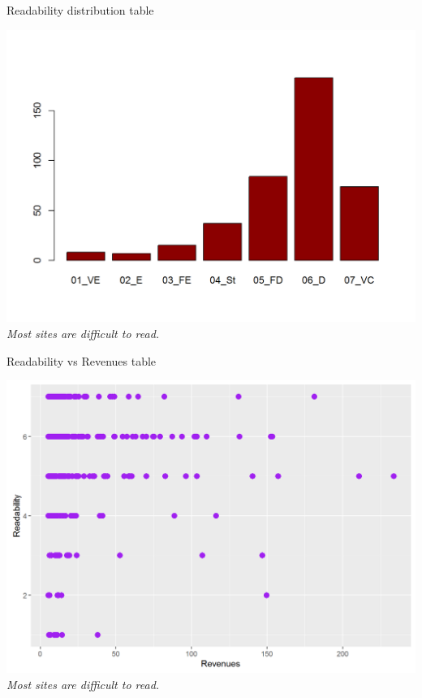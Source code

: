 \documentclass{book}
\begin{document}
\begin{table}[H]
\centering
\caption{Readability distribution table}
\begin{center}
\includegraphics[scale=0.5]{../R/photos/41_read_dist.png}    \\
\textit{Most sites are difficult to read.}
\end{center}
\end{table}
\begin{table}[H]
\centering
\caption{Readability vs Revenues table}
\begin{center}
\includegraphics[scale=0.5]{../R/photos/42_read_rev.png}   \\
\textit{Most sites are difficult to read.}
\end{center}
\end{table}
\end{document}
